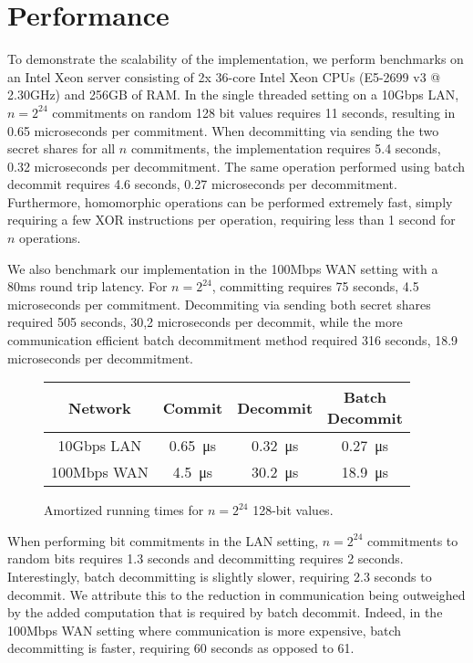 
\section{Performance}
To demonstrate the scalability of the implementation, we perform benchmarks on an Intel Xeon server consisting of 2x 36-core Intel Xeon CPUs (E5-2699 v3 @ 2.30GHz) and 256GB of RAM. In the single threaded setting on a 10Gbps LAN, $n=2^{24}$ commitments on random 128 bit values requires 11 seconds, resulting in 0.65 microseconds per commitment. When decommitting via sending the two secret shares for all $n$ commitments, the implementation requires 5.4 seconds, 0.32 microseconds per decommitment. The same operation performed using batch decommit requires 4.6 seconds, 0.27 microseconds per decommitment. Furthermore, homomorphic operations can be performed extremely fast, simply requiring  a few XOR instructions per operation, requiring less than 1 second for $n$ operations.

We also benchmark our implementation in the 100Mbps WAN setting with a 80ms round trip latency. For $n=2^{24}$, committing  requires 75 seconds, 4.5 microseconds per commitment. Decommiting via sending both secret shares required 505 seconds, 30,2 microseconds per decommit, while the more communication efficient batch decommitment method required 316 seconds, 18.9 microseconds per decommitment.

\begin{figure}
\begin{center}
  \small
  \begin{tabular}{|c|c|c|c|}
    \hline
    Network & Commit & Decommit &\shortstack{Batch \\Decommit} \\ \hline
    10Gbps LAN & \SI{0.65}{\micro\second} & \SI{0.32}{\micro\second} & \SI{0.27}{\micro\second} \\
    100Mbps WAN & \SI{4.5}{\micro\second} & \SI{30.2}{\micro\second} & \SI{18.9}{\micro\second} \\
    \hline
  \end{tabular}
  \caption{Amortized running times for $n = 2^{24}$ 128-bit values.}
  \end{center}
\end{figure}

When performing bit commitments in the LAN setting, $n=2^{24}$ commitments to random bits requires 1.3 seconds and decommitting requires 2 seconds. Interestingly, batch decommitting is slightly slower, requiring 2.3 seconds to decommit. We attribute this to the reduction in communication being outweighed by the added computation that is required by batch decommit. Indeed, in the 100Mbps WAN setting where communication is more expensive, batch decommitting is faster, requiring 60 seconds as opposed to 61.

